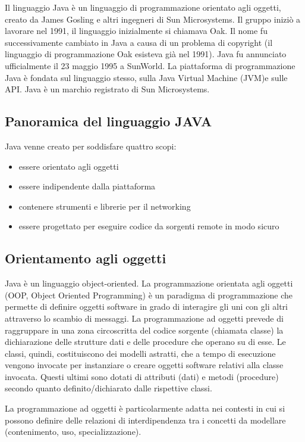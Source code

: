 Il  linguaggio Java  \`e  un  linguaggio  di  programmazione  orientato  agli  oggetti,  creato  da  James 
Gosling  e  altri  ingegneri  di  Sun  Microsystems.  Il  gruppo  inizi\`o  a  lavorare  nel  1991,  il  linguaggio 
inizialmente si chiamava Oak. Il nome fu successivamente cambiato in Java a causa di un problema di  copyright  (il  linguaggio  di  programmazione  Oak  esisteva  gi\`a nel  1991).  Java  fu  annunciato ufficialmente il 23 maggio 1995 a SunWorld. La piattaforma di programmazione Java \`e fondata sul 
linguaggio  stesso,  sulla  Java  Virtual Machine  (JVM)e  sulle  API.  Java  \`e  un  marchio  registrato  di Sun Microsystems.
\subsection{Panoramica del linguaggio JAVA}
Java venne creato per soddisfare quattro scopi: 
\begin{itemize}
\item essere orientato agli oggetti
\item essere indipendente dalla piattaforma
\item contenere strumenti e librerie per il networking
\item essere progettato per eseguire codice da sorgenti remote in modo sicuro
\end{itemize}
\subsection*{Orientamento agli oggetti}
Java \`e un linguaggio object-oriented. La programmazione orientata agli oggetti (OOP, Object Oriented Programming) \`e un paradigma di programmazione che permette di definire oggetti software in grado di interagire gli uni con gli altri attraverso lo scambio di messaggi.  
La programmazione ad oggetti prevede di raggruppare in una zona circoscritta del codice sorgente (chiamata classe) la dichiarazione delle strutture dati e delle procedure che operano su di esse. Le classi, quindi, costituiscono dei modelli astratti, che a tempo di esecuzione vengono invocate per instanziare o creare oggetti software relativi alla classe invocata. Questi ultimi sono dotati di attributi (dati) e metodi (procedure) secondo quanto definito/dichiarato dalle rispettive classi.

La programmazione ad oggetti \`e particolarmente adatta nei contesti in cui si possono definire delle relazioni di interdipendenza tra i concetti da modellare (contenimento, uso, specializzazione). 

